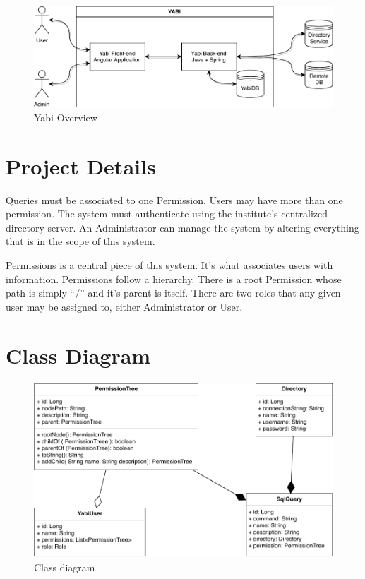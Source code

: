 
\begin{figure}
  \centering
  \includegraphics[width=\textwidth]{images/diagramas/overview.pdf}
  \caption{Yabi Overview}\label{fig:overview}
\end{figure}

\section{Project Details}
Queries must be associated to one Permission.
Users may have more than one permission.
The system must authenticate using the institute's centralized directory server.
An Administrator can manage the system by altering everything that is in the scope of this system.

Permissions is a central piece of this system. It's what associates users with information.
Permissions follow a hierarchy. There is a root Permission whose path is simply ``/'' and it's parent is itself.
There are two roles that any given user may be assigned to, either Administrator or User.

\section{Class Diagram}\label{tities}
\begin{figure}
  \centering
  \includegraphics[width=.9\textwidth]{images/diagramas/class}
  \caption{Class diagram}\label{fig:classdiagram}
\end{figure}

